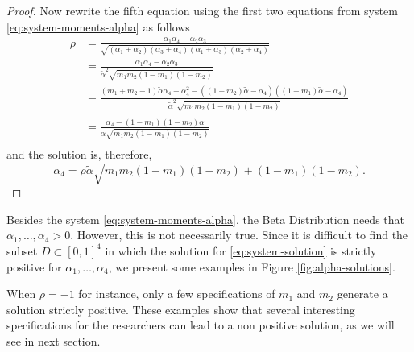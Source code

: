 \begin{proof}
Now rewrite the fifth equation using the first two equations from system \eqref{eq:system-moments-alpha} as follows 
\begin{equation*}
    \label{eq:rho-equation}
    \begin{split}
        \rho &= \frac{\alpha_1\alpha_4 - \alpha_2\alpha_3}{\sqrt{(\alpha_1+\alpha_2)(\alpha_3+\alpha_4)(\alpha_1+\alpha_3)(\alpha_2+\alpha_4)}} \\ 
        &= \frac{\alpha_1\alpha_4 - \alpha_2\alpha_3}{\tilde{\alpha}^2\sqrt{m_1m_2(1-m_1)(1-m_2)}} \\ 
        &= \frac{(m_1 + m_2 - 1)\tilde{\alpha}\alpha_4 + \alpha_4^2 - ((1-m_2)\tilde{\alpha} - \alpha_4)((1-m_1)\tilde{\alpha} - \alpha_4)}{\tilde{\alpha}^2\sqrt{m_1m_2(1-m_1)(1-m_2)}} \\
        &= \frac{\alpha_4 - (1-m_1)(1-m_2)\tilde{\alpha}}{\tilde{\alpha}\sqrt{m_1m_2(1-m_1)(1-m_2)}} \\ 
    \end{split}
\end{equation*}
and the solution is, therefore, 
$$
\alpha_4 = \rho\tilde{\alpha}\sqrt{m_1m_2(1-m_1)(1-m_2)} + (1-m_1)(1-m_2).
$$
\end{proof}

Besides the system \eqref{eq:system-moments-alpha}, the Beta Distribution needs that $\alpha_1, \dots, \alpha_4 > 0$. However, this is not necessarily true. Since it is difficult to find the subset $D \subset [0,1]^4$ in which the solution for \eqref{eq:system-solution} is strictly positive for $\alpha_1, \dots, \alpha_4$, we present some examples in Figure \ref{fig:alpha-solutions}.


When $\rho = -1$ for instance, only a few specifications of $m_1$ and $m_2$ generate a solution strictly positive. These examples show that several interesting specifications for the researchers can lead to a non positive solution, as we will see in next section. 



